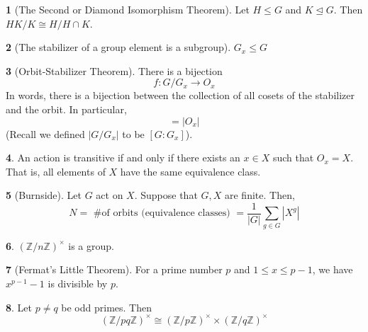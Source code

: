 \documentclass[12pt]{article}
\theoremstyle{definition}
\newtheorem{theorem}{\color{ForestGreen}{\textbf{Theorem}}}
\begin{document}
\begin{theorem}[The Second or Diamond Isomorphism Theorem]
Let $H \leq G$ and $K \trianglelefteq G$. Then $HK / K \cong H / H \cap K$.
\end{theorem}

\begin{theorem}[The stabilizer of a group element is a subgroup]
$G_x \leq G$
\end{theorem}

\begin{theorem}[Orbit-Stabilizer Theorem]
There is a bijection
\begin{equation}
f : G / G_x \to O_x
\end{equation}
In words, there is a bijection between the collection of all cosets of the stabilizer and the orbit. In particular,
\begin{equation}
[G:G_x] = |O_x|
\end{equation}
(Recall we defined $|G / G_x|$ to be $[G:G_x]$).
\end{theorem}

\begin{theorem}
An action is transitive if and only if there exists an $x \in X$ such that $O_x = X$. That is, all elements of $X$ have the same equivalence class.
\end{theorem}

\begin{theorem}[Burnside]
Let $G$ act on $X$. Suppose that $G,X$ are finite. Then,
\begin{equation}
N = \text{ \# of orbits (equivalence classes) } = \frac{1}{|G|} \sum_{g\in G} |X^g|
\end{equation}
\end{theorem}

\begin{theorem}
$(\mathbb{Z}/n \mathbb{Z})^{\times}$ is a group.
\end{theorem}

\begin{theorem}[Fermat's Little Theorem]
For a prime number $p$ and $1 \leq x \leq p-1$, we have $x^{p-1} - 1$ is divisible by $p$.
\end{theorem}

\begin{theorem}
Let $p \neq q$ be odd primes. Then
\begin{equation}
(\mathbb{Z}/pq \mathbb{Z})^{\times} \cong (\mathbb{Z}/p \mathbb{Z})^{\times} \times (\mathbb{Z}/q \mathbb{Z})^{\times}
\end{equation}
\end{theorem}
\end{document}
